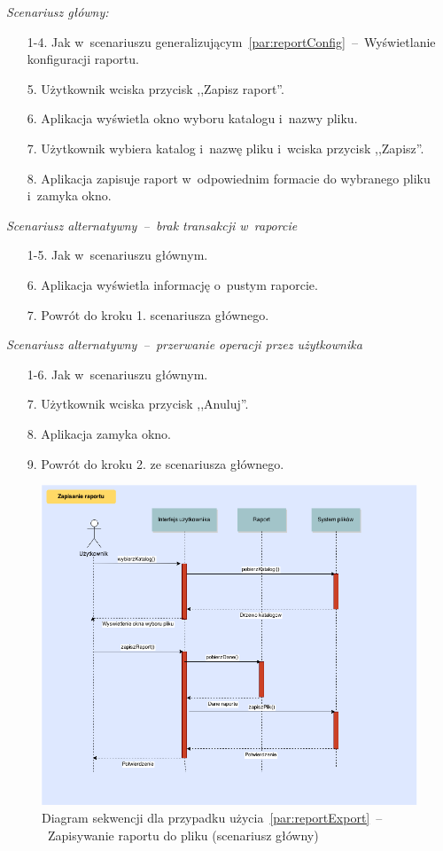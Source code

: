\noindent \noindent \textit{Scenariusz główny:}
\begin{enumerate}
  \item[1-4.] Jak w~scenariuszu generalizującym~\ref{par:reportConfig}~--~Wyświetlanie konfiguracji raportu.
  \item[5.] Użytkownik wciska przycisk ,,Zapisz raport''.
  \item[6.] Aplikacja wyświetla okno wyboru katalogu i~nazwy pliku.
  \item[7.] Użytkownik wybiera katalog i~nazwę pliku i~wciska przycisk ,,Zapisz''.
  \item[8.] Aplikacja zapisuje raport w~odpowiednim formacie do wybranego pliku i~zamyka okno.
\end{enumerate}

\noindent \textit{Scenariusz alternatywny~--~brak transakcji w~raporcie}
\begin{enumerate}
  \item[1-5.] Jak w~scenariuszu głównym.
  \item[6.] Aplikacja wyświetla informację o~pustym raporcie.
  \item[7.] Powrót do kroku 1. scenariusza głównego.
\end{enumerate}

\noindent \textit{Scenariusz alternatywny~--~przerwanie operacji przez użytkownika}
\begin{enumerate}
  \item[1-6.] Jak w~scenariuszu głównym.
  \item[7.] Użytkownik wciska przycisk ,,Anuluj''.
  \item[8.] Aplikacja zamyka okno.
  \item[9.] Powrót do kroku 2. ze scenariusza głównego.
\end{enumerate}

\begin{figure}[H]
  \includegraphics[width=\textwidth]{images/raport_export.png}
  \caption{Diagram sekwencji dla przypadku użycia~\ref{par:reportExport}~--~Zapisywanie raportu do pliku (scenariusz główny)}
\end{figure}

